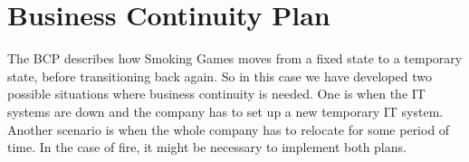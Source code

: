 \chapter{Business Continuity Plan}
The BCP describes how Smoking Games moves from a fixed state to a temporary state, before transitioning back again. So in this case we have developed two possible situations where business continuity is needed. One is when the IT systems are down and the company has to set up a new temporary IT system. Another scenario is when the whole company has to relocate for some period of time. In the case of fire, it might be necessary to implement both plans.

